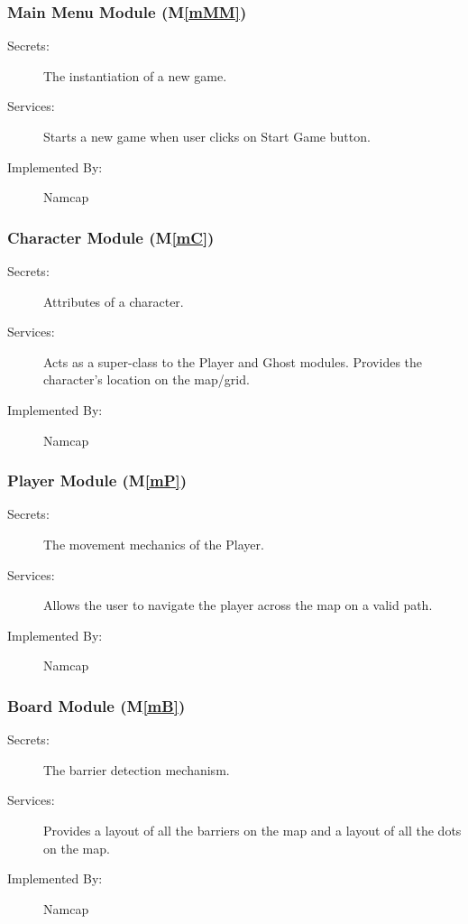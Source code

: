\documentclass[12pt, titlepage]{article}
\newcommand{\mref}[1]{M\ref{#1}}
\begin{document}
\subsubsection{Main Menu Module (\mref{mMM})}

\begin{description}
\item[Secrets:]The instantiation of a new game.
\item[Services:]Starts a new game when user clicks on Start Game button.
\item[Implemented By:] Namcap
\end{description}

\subsubsection{Character Module (\mref{mC})}

\begin{description}
\item[Secrets:]Attributes of a character.
\item[Services:]Acts as a super-class to the Player and Ghost modules. Provides the character's location on the map/grid.
\item[Implemented By:] Namcap
\end{description}

\subsubsection{Player Module (\mref{mP})}

\begin{description}
\item[Secrets:]The movement mechanics of the Player.
\item[Services:]Allows the user to navigate the player across the map on a valid path.
\item[Implemented By:] Namcap
\end{description}

\subsubsection{Board Module (\mref{mB})}

\begin{description}
\item[Secrets:]The barrier detection mechanism.
\item[Services:]Provides a layout of all the barriers on the map and a layout of all the dots on the map.
\item[Implemented By:] Namcap
\end{description}
\end{document}
